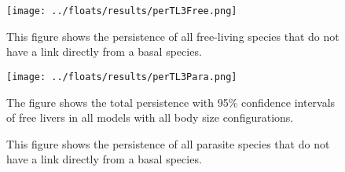 \documentclass[11pt]{amsart}
\begin{document}
\begin{figure}[h]
\captionsetup[subfigure]{labelfont = it, textfont = it,labelformat = parens,labelsep = space}
    \begin{minipage}{.45\textwidth}
    \end{minipage}
    \begin{minipage}{.45\textwidth}
    \end{minipage}
    \texttt{[image: ../floats/results/perTL3Free.png]}
    \begin{minipage}{.45\textwidth}
    \end{minipage}
    \begin{minipage}{.45\textwidth}
    \end{minipage}
\caption{This figure shows the persistence of all free-living species that do not have a link directly from a basal species.\label{tl3-free}}
\end{figure}

\begin{figure}[h]
\captionsetup[subfigure]{labelfont = it, textfont = it,labelformat = parens,labelsep = space}
    \begin{minipage}{.45\textwidth}
    \end{minipage}
    \begin{minipage}{.45\textwidth}
    \end{minipage}
    \texttt{[image: ../floats/results/perTL3Para.png]}
\caption{The figure shows the total persistence with 95\% confidence intervals of free livers in all models with all body size configurations.}
    \begin{minipage}{.45\textwidth}
    \end{minipage}
    \begin{minipage}{.45\textwidth}
    \end{minipage}
\caption{This figure shows the persistence of all parasite species that do not have a link directly from a basal species.\label{tl3-para}}
\end{figure}
\end{document}
